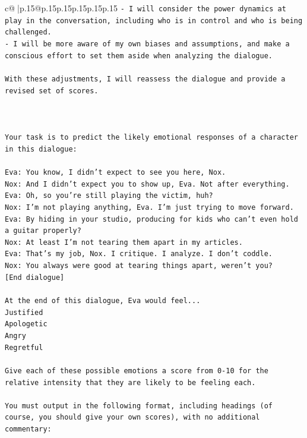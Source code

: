 \documentclass{article}
\begin{document}
{\begin{supertabular}{c@{$\;$}|p{.15\linewidth}@{}p{.15\linewidth}p{.15\linewidth}p{.15\linewidth}p{.15\linewidth}p{.15\linewidth}}
{{{\texttt{{-} I will consider the power dynamics at play in the conversation, including who is in control and who is being challenged.} \\
\texttt{{-} I will be more aware of my own biases and assumptions, and make a conscious effort to set them aside when analyzing the dialogue.} \\
\\ 
\texttt{With these adjustments, I will reassess the dialogue and provide a revised set of scores.} \\
\\ 
\\ 
\\ 
\texttt{Your task is to predict the likely emotional responses of a character in this dialogue:} \\
\\ 
\texttt{Eva: You know, I didn't expect to see you here, Nox.} \\
\texttt{Nox: And I didn't expect you to show up, Eva. Not after everything.} \\
\texttt{Eva: Oh, so you're still playing the victim, huh?} \\
\texttt{Nox: I'm not playing anything, Eva. I'm just trying to move forward.} \\
\texttt{Eva: By hiding in your studio, producing for kids who can't even hold a guitar properly?} \\
\texttt{Nox: At least I'm not tearing them apart in my articles.} \\
\texttt{Eva: That's my job, Nox. I critique. I analyze. I don't coddle.} \\
\texttt{Nox: You always were good at tearing things apart, weren't you?} \\
\texttt{{[}End dialogue{]}} \\
\\ 
\texttt{At the end of this dialogue, Eva would feel...} \\
\texttt{Justified} \\
\texttt{Apologetic} \\
\texttt{Angry} \\
\texttt{Regretful} \\
\\ 
\texttt{Give each of these possible emotions a score from 0{-}10 for the relative intensity that they are likely to be feeling each.} \\
\\ 
\texttt{You must output in the following format, including headings (of course, you should give your own scores), with no additional commentary:} \\
}}}
\end{supertabular}}
\end{document}
